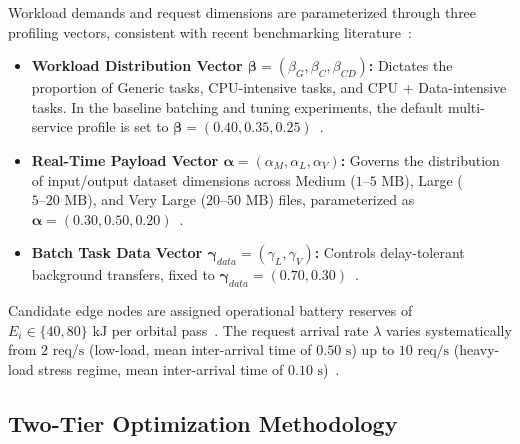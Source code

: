 Workload demands and request dimensions are parameterized through three profiling vectors, consistent with recent benchmarking literature~\cite{icdcs_satellite_2025}:
\begin{itemize}
    \item \textbf{Workload Distribution Vector $\boldsymbol{\beta} = (\beta_G, \beta_C, \beta_{CD})$:} Dictates the proportion of Generic tasks, CPU-intensive tasks, and CPU + Data-intensive tasks. In the baseline batching and tuning experiments, the default multi-service profile is set to $\boldsymbol{\beta} = (0.40, 0.35, 0.25)$~\cite{icdcs_satellite_2025}.
    \item \textbf{Real-Time Payload Vector $\boldsymbol{\alpha} = (\alpha_M, \alpha_L, \alpha_V)$:} Governs the distribution of input/output dataset dimensions across Medium ($1\text{--}5\text{ MB}$), Large ($5\text{--}20\text{ MB}$), and Very Large ($20\text{--}50\text{ MB}$) files, parameterized as $\boldsymbol{\alpha} = (0.30, 0.50, 0.20)$~\cite{icdcs_satellite_2025, leyva2023satellite}.
    \item \textbf{Batch Task Data Vector $\boldsymbol{\gamma}_{data} = (\gamma_L, \gamma_V)$:} Controls delay-tolerant background transfers, fixed to $\boldsymbol{\gamma}_{data} = (0.70, 0.30)$~\cite{denby2019orbital}.
\end{itemize}

Candidate edge nodes are assigned operational battery reserves of $E_i \in \{40, 80\}\text{ kJ}$ per orbital pass~\cite{icdcs_satellite_2025, peng2025blocked}. The request arrival rate $\lambda$ varies systematically from $2\text{ req/s}$ (low-load, mean inter-arrival time of $0.50\text{ s}$) up to $10\text{ req/s}$ (heavy-load stress regime, mean inter-arrival time of $0.10\text{ s}$)~\cite{icdcs_satellite_2025}.

\subsection{Two-Tier Optimization Methodology}
\label{subsec:methodology_roadmap}

